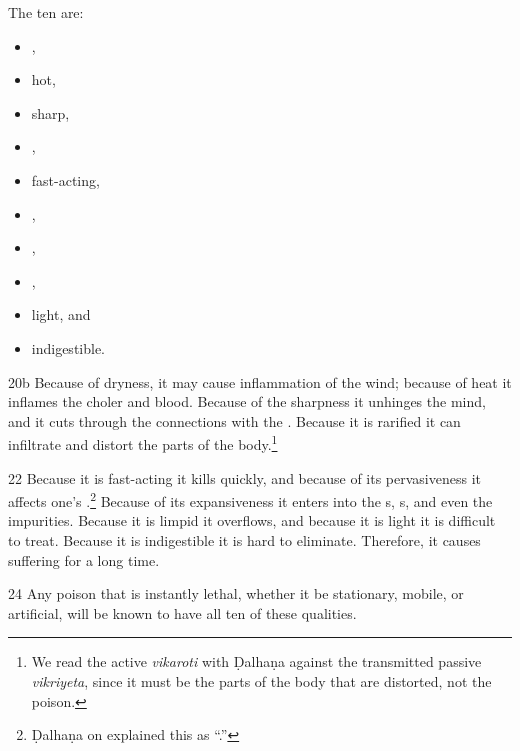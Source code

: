 \begin{translation}
    The ten are:
    \begin{itemize}
        \item    {}, 
        \item hot, 
        \item sharp, 
        \item {},
        \item     fast-acting, 
        \item {}, 
        \item {}, 
        \item {},
        \item     light, and 
        \item indigestible.    
    \end{itemize}
    \item[ 20b]
    Because of dryness, it may cause inflammation of the wind; because of heat
    it inflames the choler and blood. 
    Because of the sharpness it unhinges the
    mind, and it cuts through the connections with the .  Because it is rarified it can infiltrate and distort
    the parts of the body.\footnote{We read the active \emph{vikaroti} with 
    Ḍalhaṇa against the 
    transmitted passive \emph{vikriyeta}, since it must be the parts of the body 
    that are distorted, not the poison.}    
    

\item[22]
Because it is fast-acting it kills quickly, and because of its pervasiveness
it affects one's .\footnote{Ḍalhaṇa
on  explained this as “.”}  Because of its expansiveness it enters
into the s, s, and even the
impurities.  Because it is limpid it overflows, and
because it is light it is difficult to treat.  Because it is indigestible it
is hard to eliminate.  Therefore, it causes suffering for a long time.
    
    \item[ 24]
    Any poison that is instantly lethal, whether it be
    stationary, mobile, or artificial, will be known to 
    have all ten of these qualities.
    
    
  
    

\end{translation}
